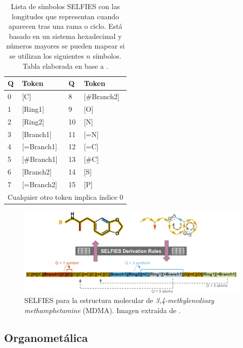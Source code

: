 \begin{table}[h!]
    \centering
    \small
    \begin{tabular}{|ll|ll|}
       \toprule 
       Q & Token        & Q     & Token \\
       \midrule
       0 & [C]          & 8     & [\#Branch2] \\
       1 & [Ring1]      & 9     & [O] \\
       2 & [Ring2]      & 10    & [N] \\
       3 & [Branch1]    & 11    & [=N] \\
       4 & [=Branch1]   & 12    & [=C] \\
       5 & [\#Branch1]  & 13    & [\#C] \\
       6 & [Branch2]    & 14    & [S] \\
       7 & [=Branch2]   & 15    & [P] \\
       \midrule
       \multicolumn{4}{|c|}{Cualquier otro token implica índice 0}\\
       \bottomrule
    \end{tabular}
    \caption{Lista de símbolos SELFIES con las longitudes que representan cuando aparecen tras una rama o ciclo. Está basado en un sistema hexadecimal y números mayores se pueden mapear si se utilizan los siguientes $n$ símbolos. Tabla elaborada en base a \cite{SELFIES}.}
    \label{tab:tokens_longitud}
\end{table}

\begin{figure}[h!]
    \centering
    \includegraphics[scale=0.43]{imagenes/estado_arte/teoria/selfies_ejemplo.png}
    \caption{SELFIES para la estructura molecular de \textit{3,4-methylenedioxy methamphetamine} (MDMA). Imagen extraída de \cite{SELFIES}.}
    \label{fig:selfies_ejemplo}
\end{figure}



\subsection{Organometálica} \label{teoria:ogm}

